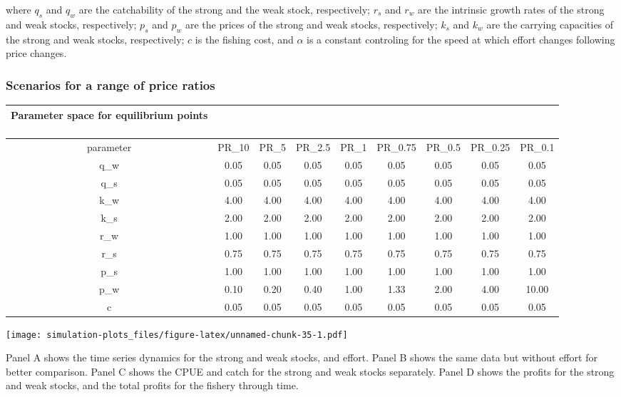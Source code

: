 \documentclass[
]{article}
\begin{document}
where \(q_s\) and \(q_w\) are the catchability of the strong and the
weak stock, respectively; \(r_s\) and \(r_w\) are the intrinsic growth
rates of the strong and weak stocks, respectively; \(p_s\) and \(p_w\)
are the prices of the strong and weak stocks, respectively; \(k_s\) and
\(k_w\) are the carrying capacities of the strong and weak stocks,
respectively; \(c\) is the fishing cost, and \(\alpha\) is a constant
controling for the speed at which effort changes following price
changes.

\hypertarget{scenarios-for-a-range-of-price-ratios}{%
\subsubsection{Scenarios for a range of price
ratios}\label{scenarios-for-a-range-of-price-ratios}}

\captionsetup[table]{labelformat=empty,skip=1pt}
\begin{longtable}{ccccccccc}
\caption*{
\large Parameter space for equilibrium points\\ 
\small \\ 
} \\ 
\toprule
parameter & PR\_10 & PR\_5 & PR\_2.5 & PR\_1 & PR\_0.75 & PR\_0.5 & PR\_0.25 & PR\_0.1 \\ 
\midrule
q\_w & 0.05 & 0.05 & 0.05 & 0.05 & 0.05 & 0.05 & 0.05 & 0.05 \\ 
q\_s & 0.05 & 0.05 & 0.05 & 0.05 & 0.05 & 0.05 & 0.05 & 0.05 \\ 
k\_w & 4.00 & 4.00 & 4.00 & 4.00 & 4.00 & 4.00 & 4.00 & 4.00 \\ 
k\_s & 2.00 & 2.00 & 2.00 & 2.00 & 2.00 & 2.00 & 2.00 & 2.00 \\ 
r\_w & 1.00 & 1.00 & 1.00 & 1.00 & 1.00 & 1.00 & 1.00 & 1.00 \\ 
r\_s & 0.75 & 0.75 & 0.75 & 0.75 & 0.75 & 0.75 & 0.75 & 0.75 \\ 
p\_s & 1.00 & 1.00 & 1.00 & 1.00 & 1.00 & 1.00 & 1.00 & 1.00 \\ 
p\_w & 0.10 & 0.20 & 0.40 & 1.00 & 1.33 & 2.00 & 4.00 & 10.00 \\ 
c & 0.05 & 0.05 & 0.05 & 0.05 & 0.05 & 0.05 & 0.05 & 0.05 \\ 
\bottomrule
\end{longtable}

\texttt{[image: simulation-plots\_files/figure-latex/unnamed-chunk-35-1.pdf]}

Panel A shows the time series dynamics for the strong and weak stocks,
and effort. Panel B shows the same data but without effort for better
comparison. Panel C shows the CPUE and catch for the strong and weak
stocks separately. Panel D shows the profits for the strong and weak
stocks, and the total profits for the fishery through time.
\end{document}
